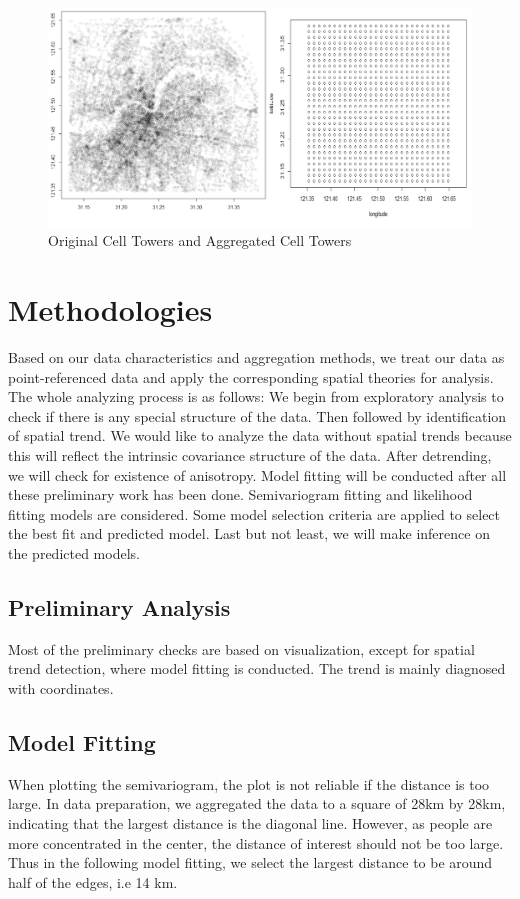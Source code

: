 \documentclass[hidelinks,12pt]{article}
\begin{document}
	\begin{figure}[!ht]
		\includegraphics[width=\textwidth]{tower.png}
		\caption{Original Cell Towers and Aggregated Cell Towers \label{fig:tower}}
	\end{figure}
	\FloatBarrier
	
	\section{Methodologies}\label{sec:meth}
	Based on our data characteristics and aggregation methods, we treat our data as point-referenced data and apply the corresponding spatial theories for analysis. The whole analyzing process is as follows: We begin from exploratory analysis to check if there is any special structure of the data. Then followed by identification of spatial trend. We would like to analyze the data without spatial trends because this will reflect the intrinsic covariance structure of the data. After detrending, we will check for existence of anisotropy. Model fitting will be conducted after all these preliminary work has been done. Semivariogram fitting and likelihood fitting models are considered. Some model selection criteria are applied to select the best fit and predicted model. Last but not least, we will make inference on the predicted models.
	
	\subsection{Preliminary Analysis}
	Most of the preliminary checks are based on visualization, except for spatial trend detection, where model fitting is conducted. The trend is mainly diagnosed with coordinates.
	\subsection{Model Fitting}
	When plotting the semivariogram, the plot is not reliable if the distance is too large. In data preparation, we aggregated the data to a square of 28km by 28km, indicating that the largest distance is the diagonal line. However, as people are more concentrated in the center, the distance of interest should not be too large. Thus in the following model fitting, we select the largest distance to be around half of the edges, i.e 14 km.
\end{document}
